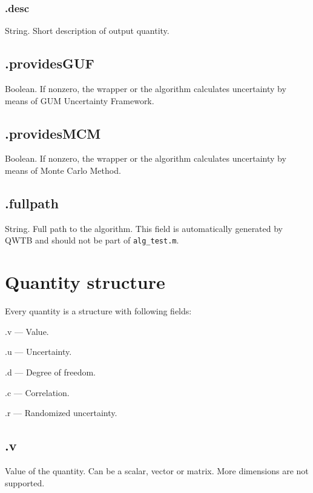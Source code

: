 \documentclass[12pt,a4paper,oneside]{report} %
\begin{document}
\subsubsection{\textsf{.desc}} %
String. Short description of output quantity.

\subsection{\textsf{.providesGUF}} %
\label{structalginfoprovidesGUF}
Boolean. If nonzero, the wrapper or the algorithm calculates uncertainty by means of GUM Uncertainty
Framework.

\subsection{\textsf{.providesMCM}} %
\label{structalginfoprovidesMCM}
Boolean. If nonzero, the wrapper or the algorithm calculates uncertainty by means of Monte Carlo
Method.

\subsection{\textsf{.fullpath}} %
\label{structalginfofullpath}
String. Full path to the algorithm. This field is automatically generated by QWTB and should not be
part of {\tt alg\_test.m}.

\section{Quantity structure} %
\label{structquantity}
Every quantity is a structure with following fields:
\begin{tightdesc}
        \item [\textsf{.v}] --- Value.
        \item [\textsf{.u}] --- Uncertainty.
        \item [\textsf{.d}] --- Degree of freedom.
        \item [\textsf{.c}] --- Correlation.
        \item [\textsf{.r}] --- Randomized uncertainty.
\end{tightdesc}

\subsection{\textsf{.v}} %
\label{structquantityv}
Value of the quantity. Can be a scalar, vector or matrix. More dimensions are not
supported. 
\end{document}
